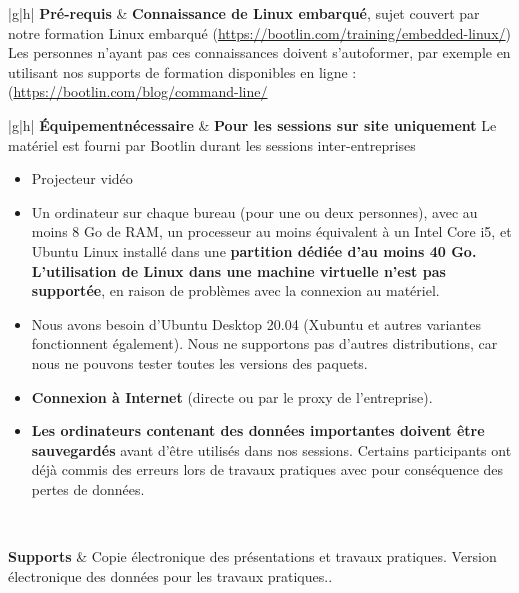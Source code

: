 \documentclass[a4paper,12pt,obeyspaces,spaces,hyphens]{article}
\begin{document}
{\begin{tabularx}{\textwidth}{|g|h|}
    {\bf Pré-requis} & {\bf Connaissance de Linux embarqué}, sujet couvert par
    notre formation Linux embarqué (\url{https://bootlin.com/training/embedded-linux/}) \vspace{1em}
    \newline Les personnes n'ayant pas ces connaissances doivent
    s'autoformer, par exemple en utilisant nos supports de formation
    disponibles en ligne :
    (\url{https://bootlin.com/blog/command-line/} \\
    \hline
  \end{tabularx}

  \begin{tabularx}{\textwidth}{|g|h|}
    {\bf Équipement\newline nécessaire} &
    {\bf Pour les sessions sur site uniquement}
    \newline Le matériel est fourni par Bootlin durant les
    sessions inter-entreprises
    \begin{itemize}
    \item Projecteur vidéo
    \item Un ordinateur sur chaque bureau (pour une ou deux personnes), avec au
    moins 8 Go de RAM, un processeur au moins équivalent à un Intel Core i5,
    et Ubuntu Linux installé dans une {\bf partition
    dédiée d'au moins 40 Go. L'utilisation de Linux dans une machine virtuelle
    n'est pas supportée}, en raison de problèmes avec la connexion au matériel.
    \item Nous avons besoin d'Ubuntu Desktop 20.04 (Xubuntu et autres
    variantes fonctionnent également). Nous ne supportons pas d'autres
    distributions, car nous ne pouvons tester toutes les versions des
    paquets.
    \item {\bf Connexion à Internet} (directe ou par le proxy de l'entreprise).
    \item {\bf Les ordinateurs contenant des données importantes doivent être
    sauvegardés} avant d'être utilisés dans nos sessions. Certains
    participants ont déjà commis des erreurs lors de travaux pratiques
    avec pour conséquence des pertes de données.
    \end{itemize} \\
    \hline

    {\bf Supports} & Copie électronique des présentations et travaux pratiques.
    \newline Version électronique des données pour les travaux
    pratiques..\\
    \hline

\end{tabularx}}
\normalsize
\end{document}
